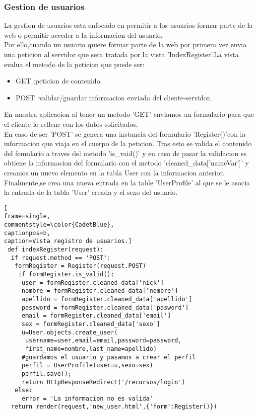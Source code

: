 \subsubsection*{Gestion de usuarios}
La gestion de usuarios esta enfocado en permitir a los usuarios formar parte de la web o permitir acceder a la informacion del usuario.
\\Por ello,cuando un usuario quiere formar parte de la web por primera vez envia una peticion al servidor que sera tratada por la vista 'IndexRegister'.La vista evalua el metodo de la peticion que puede ser:
\begin{itemize}
\item GET :peticion de contenido.
\item POST :validar/guardar informacion enviada del cliente-servidor.
\end{itemize}
En nuestra aplicacion al tener un metodo 'GET' enviamos un formulario para que el cliente lo rellene con los datos solicitados.
\\En caso de ser 'POST' se genera una instancia del formulario 'Register()'con la informacion que viaja en el cuerpo de la peticion. Tras esto se valida el contenido del fomulario a traves del metodo 'is\_vaid()' y en caso de pasar la validacion se obtiene la informacion del formulario con el metodo 'cleaned\_data['nameVar']' y creamos un nuevo elemento en la tabla User con la informacion anterior.
\\Finalmente,se crea una nueva entrada en la table 'UserProfile' al que se le asocia la entrada de la tabla 'User' creada y el sexo del usuario.
\begin{lstlisting}[
frame=single,
commentstyle=\color{CadetBlue},
captionpos=b,
caption=Vista registro de usuarios.]
 def indexRegister(request):
  if request.method == 'POST':
   formRegister = Register(request.POST)
    if formRegister.is_valid():
     user = formRegister.cleaned_data['nick']
     nombre = formRegister.cleaned_data['nombre']
     apellido = formRegister.cleaned_data['apellido']
     password = formRegister.cleaned_data['pasword']
     email = formRegister.cleaned_data['email']
     sex = formRegister.cleaned_data['sexo']
     u=User.objects.create_user(
      username=user,email=email,password=password,
      first_name=nombre,last_name=apellido)
     #guardamos el usuario y pasamos a crear el perfil
     perfil = UserProfile(user=u,sexo=sex)
     perfil.save();
     return HttpResponseRedirect('/recursos/login')
   else:
     error = 'La informacion no es valida'
  return render(request,'new_user.html',{'form':Register()})
\end{lstlisting}
